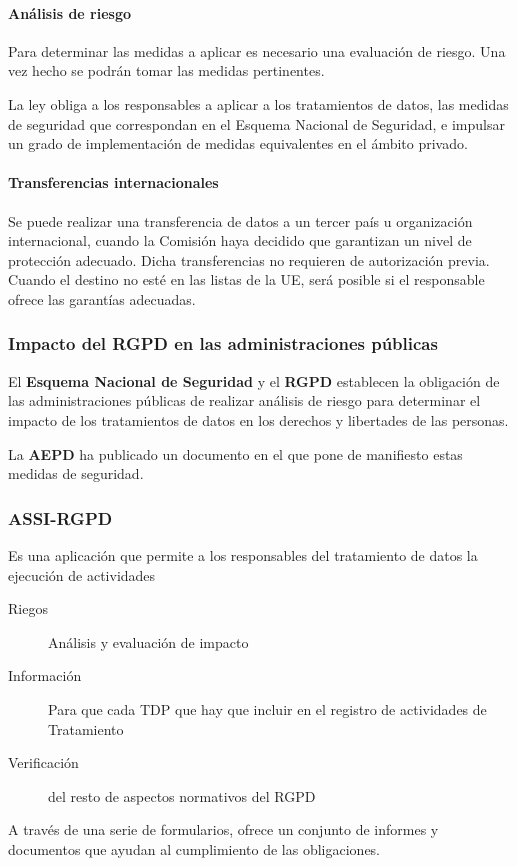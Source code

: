         \paragraph{Análisis de riesgo}
            Para determinar las medidas a aplicar es necesario una evaluación de riesgo. Una vez hecho se podrán tomar las medidas pertinentes.

            La ley obliga a los responsables a aplicar a los tratamientos de datos, las medidas de seguridad que correspondan en el Esquema Nacional de Seguridad, e impulsar un grado de implementación de medidas equivalentes en el ámbito privado.
        
        \paragraph{Transferencias internacionales}
            Se puede realizar una transferencia de datos a un tercer país u organización internacional, cuando la Comisión haya decidido que garantizan un nivel de protección adecuado. Dicha transferencias no requieren de autorización previa. Cuando el destino no esté en las listas de la UE, será posible si el responsable ofrece las garantías adecuadas.

    \subsubsection{Impacto del RGPD en las administraciones públicas}
        El \textbf{Esquema Nacional de Seguridad} y el \textbf{RGPD} establecen la obligación de las administraciones públicas de realizar análisis de riesgo para determinar el impacto de los tratamientos de datos en los derechos y libertades de las personas.

        La \textbf{AEPD} ha publicado un documento en el que pone de manifiesto estas medidas de seguridad.

    \subsubsection{ASSI-RGPD}
        Es una aplicación que permite a los responsables del tratamiento de datos la ejecución de actividades
        \begin{description}
            \item[Riegos] Análisis y evaluación de impacto
            \item[Información] Para que cada TDP que hay que incluir en el registro de actividades de Tratamiento
            \item[Verificación] del resto de aspectos normativos del RGPD
        \end{description}
        A través de una serie de formularios, ofrece un conjunto de informes y documentos que ayudan al cumplimiento de las obligaciones.

